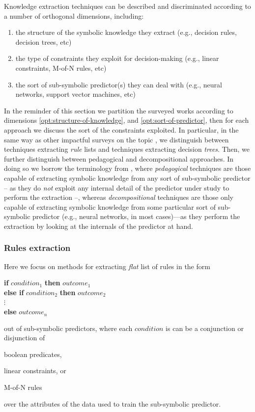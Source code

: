 \documentclass[12pt,a4paper,openright,twoside]{book}
\begin{document}
Knowledge extraction techniques can be described and discriminated according to a number of orthogonal dimensions, including:
%
\begin{enumerate}
	\item\label{opt:structure-of-knowledge} the structure of the symbolic knowledge they extract (e.g., decision rules, decision trees, etc)
	\item the type of constraints they exploit for decision-making (e.g., linear constraints, M-of-N rules, etc)
	\item\label{opt:sort-of-predictor} the sort of sub-symbolic predictor(s) they can deal with (e.g., neural networks, support vector machines, etc)
\end{enumerate}
%
In the reminder of this section we partition the surveyed works according to dimensions \ref{opt:structure-of-knowledge}, and \ref{opt:sort-of-predictor}, then for each approach we discuss the sort of the constraints exploited.
%
In particular, in the same way as other impactful surveys on the topic \cite{GuidottiMRTGP19,AndrewsDT95}, we distinguish between techniques extracting \emph{rule} lists and techniques extracting decision \emph{trees}.
%
Then, we further distinguish between pedagogical and decompositional approaches.
%
In doing so we borrow the terminology from \cite{AndrewsDT95}, where \emph{pedagogical} techniques are those capable of extracting symbolic knowledge from any sort of sub-symbolic predictor -- as they do \emph{not} exploit any internal detail of the predictor under study to perform the extraction --, whereas \emph{decompositional} techniques are those only capable of extracting symbolic knowledge from some particular sort of sub-symbolic predictor (e.g., neural networks, in most cases)---as they perform the extraction by looking at the internals of the predictor at hand.

\subsubsection{Rules extraction}

Here we focus on methods for extracting \emph{flat} list of rules in the form
%
\begin{center}
	\textbf{if} $condition_1$ \textbf{then} $outcome_1$
	\\
	\textbf{else if} $condition_2$ \textbf{then} $outcome_2$
	\\
	$\vdots$
	\\
	\textbf{else} $outcome_n$
\end{center}
%
out of sub-symbolic predictors, where each $condition$ is can be a conjunction or disjunction of
%
\begin{inlinelist}
    \item boolean predicates,
    \item linear constraints, or
    \item M-of-N rules
\end{inlinelist}
%
over the attributes of the data used to train the sub-symbolic predictor.
\end{document}
